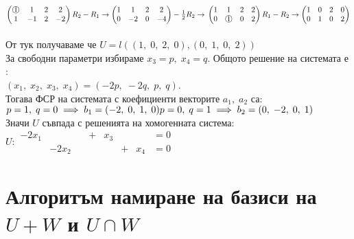 \documentclass[12pt]{article}
\newcommand*{\mcirc}[1]{\text{\raisebox{.5pt}{\textcircled{\raisebox{-.9pt} {#1}}}}}
\begin{document}
$\begin{pmatrix}
    \mcirc{1} &  1 & 2 &  2 \\
    1 & -1 & 2 & -2
\end{pmatrix} R_2 - R_1 \to \begin{pmatrix}
    1 &  1 & 2 &  2 \\
    0 & -2 & 0 & -4
\end{pmatrix} -\frac{1}{2} R_2 \to \\\\\\
\begin{pmatrix}
    1 &  1 & 2 &  2 \\
    0 & \mcirc{1} & 0 & 2
\end{pmatrix} R_1 - R_2 \to \begin{pmatrix}
    1 & 0 & 2 & 0 \\
    0 & 1 & 0 & 2
\end{pmatrix}$ \\\\

От тук получаваме че $U = l((1, \; 0, \; 2, \; 0), (0, \; 1, \; 0, \; 2))$ \\

За свободни параметри избираме $x_3 = p, \; x_4 = q$. Общото решение на системата е : \\

$(x_1, \; x_2, \; x_3, \; x_4) = (-2p, \; -2q, \; p, \; q)$. \\

Тогава ФСР на системата с коефициенти векторите $a_1, \; a_2$ са: \\

$p = 1, \; q = 0 \implies b_1 = (-2, \; 0, \; 1, \; 0) \\
p = 0, \; q = 1 \implies b_2 = (0, \; -2, \; 0, \; 1)$ \\

Значи $U$ съвпада с решенията на хомогенната система: \\

$U : \begin{array}{|lccccccr}
    -2x_1 & ~     & ~ & + & x_3 & ~ & ~   & = 0 \\
    ~     & -2x_2 & ~ & ~ & ~   & + & x_4 & = 0
\end{array}$

\section*{Алгоритъм намиране на базиси на $U + W$ и $U \cap W$}
\end{document}
